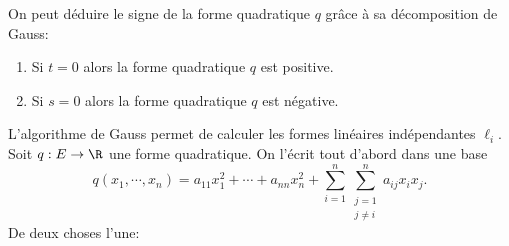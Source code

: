 \begin{remark} On peut déduire le signe de la forme quadratique $q$ grâce à sa décomposition de Gauss:
	\begin{enumerate}
		\item Si $t=0$ alors la forme quadratique $q$ est positive.
		\item Si $s=0$ alors la forme quadratique $q$ est négative.
	\end{enumerate}
\end{remark}

\pl{\rep{6cm}}


\sld{\vfill\pagebreak[5]}%
L'algorithme de Gauss permet de calculer les formes linéaires indépendantes $\ell_i$. Soit $q:E\to \R$ une forme quadratique. On l'écrit tout d'abord dans une base 
\[
	q(x_1,\cdots,x_n) = a_{11} x_1^2 + \cdots + a_{nn} x_n^2 + \sum_{i=1}^n\sum_{\substack{ j=1 \\ j\neq i }}^n a_{ij} x_ix_j.
\]
De deux choses l'une:
\sld{\vfill\pagebreak[5]}%

